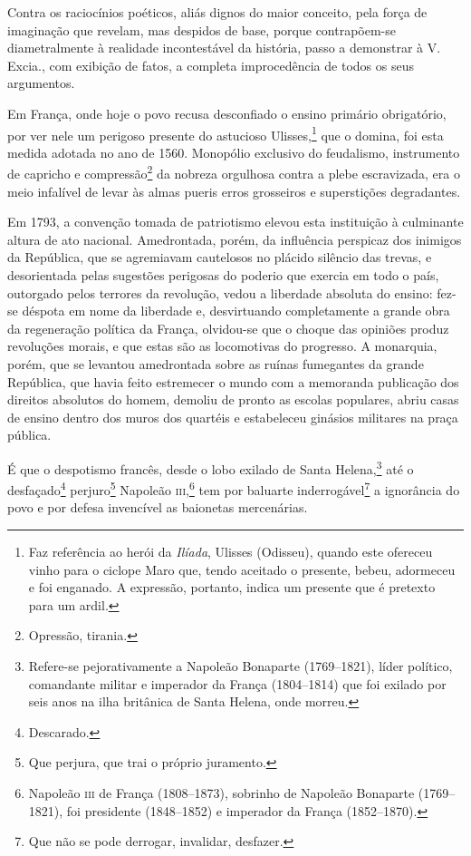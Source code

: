 Contra os raciocínios poéticos, aliás dignos do maior conceito, pela
força de imaginação que revelam, mas despidos de base, porque
contrapõem-se diametralmente à realidade incontestável da história,
passo a demonstrar à V.\,Excia., com exibição de fatos, a completa
improcedência de todos os seus argumentos.

Em França, onde hoje o povo recusa desconfiado o ensino primário
obrigatório, por ver nele um perigoso presente do astucioso
Ulisses,\footnote{Faz referência ao herói da \textit{Ilíada}, Ulisses (Odisseu),
  quando este ofereceu vinho para o ciclope Maro que, tendo aceitado o
  presente, bebeu, adormeceu e foi enganado. A expressão, portanto,
  indica um presente que é pretexto para um ardil.} que o domina, foi
esta medida adotada no ano de 1560. Monopólio exclusivo do feudalismo,
instrumento de capricho e compressão\footnote{Opressão, tirania.} da
nobreza orgulhosa contra a plebe escravizada, era o meio infalível de
levar às almas pueris erros grosseiros e superstições degradantes.

Em 1793, a convenção tomada de patriotismo elevou esta instituição à
culminante altura de ato nacional. Amedrontada, porém, da influência
perspicaz dos inimigos da República, que se agremiavam cautelosos no
plácido silêncio das trevas, e desorientada pelas sugestões perigosas do
poderio que exercia em todo o país, outorgado pelos terrores da
revolução, vedou a liberdade absoluta do ensino: fez-se déspota em nome
da liberdade e, desvirtuando completamente a grande obra da regeneração
política da França, olvidou-se que o choque das opiniões produz
revoluções morais, e que estas são as locomotivas do progresso. A
monarquia, porém, que se levantou amedrontada sobre as ruínas fumegantes
da grande República, que havia feito estremecer o mundo com a memoranda
publicação dos direitos absolutos do homem, demoliu de pronto as escolas
populares, abriu casas de ensino dentro dos muros dos quartéis e
estabeleceu ginásios militares na praça pública.

É que o despotismo francês, desde o lobo exilado de Santa
Helena,\footnote{Refere-se pejorativamente a Napoleão Bonaparte
  (1769--1821), líder político, comandante militar e imperador da França
  (1804--1814) que foi exilado por seis anos na ilha britânica de Santa
  Helena, onde morreu.} até o desfaçado\footnote{Descarado.}
perjuro\footnote{Que perjura, que trai o próprio juramento.} Napoleão
\textsc{iii},\footnote{Napoleão \textsc{iii} de França (1808--1873), sobrinho de Napoleão
  Bonaparte (1769--1821), foi presidente (1848--1852) e imperador da
  França (1852--1870).} tem por baluarte inderrogável\footnote{Que não
  se pode derrogar, invalidar, desfazer.} a ignorância do povo e por
defesa invencível as baionetas mercenárias.

